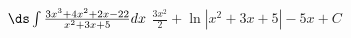 {$\ds \int \frac{3 x^3+4 x^2+2 x-22}{x^2+3 x+5} dx $}
{$\frac{3 x^2}{2}+\ln \left|x^2+3 x+5\right|-5 x+C$}